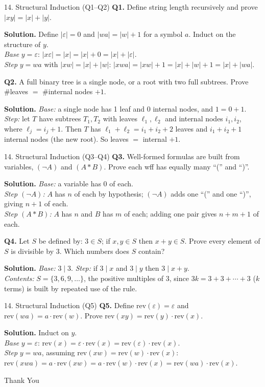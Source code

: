 \documentclass[aspectratio=169,10pt]{beamer}
\newcommand{\qa}[3]{%
  \textbf{Q#1.} #2\par\smallskip
  {\color{ans}\textbf{Solution.} #3}\par\vspace{6pt}}
\begin{document}
\begin{frame}{14. Structural Induction (Q1--Q2)}
\footnotesize
\qa{1}{Define string length recursively and prove $|xy|=|x|+|y|$.}
{Define $|\varepsilon|=0$ and $|wa|=|w|+1$ for a symbol $a$. Induct on the structure of $y$.\\
\emph{Base} $y=\varepsilon$: $|x\varepsilon|=|x|=|x|+0=|x|+|\varepsilon|$.\\
\emph{Step} $y=wa$ with $|xw|=|x|+|w|$: $|xwa|=|xw|+1=|x|+|w|+1=|x|+|wa|$.}
\qa{2}{A full binary tree is a single node, or a root with two full subtrees. Prove \#leaves $=$ \#internal nodes $+1$.}
{\emph{Base:} a single node has 1 leaf and 0 internal nodes, and $1=0+1$.\\
\emph{Step:} let $T$ have subtrees $T_1,T_2$ with leaves $\ell_1,\ell_2$ and internal nodes $i_1,i_2$, where $\ell_j=i_j+1$. Then $T$ has $\ell_1+\ell_2=i_1+i_2+2$ leaves and $i_1+i_2+1$ internal nodes (the new root). So leaves $=$ internal $+1$.}
\end{frame}

\begin{frame}{14. Structural Induction (Q3--Q4)}
\footnotesize
\qa{3}{Well-formed formulas are built from variables, $(\neg A)$ and $(A\ast B)$. Prove each wff has equally many ``('' and ``)''.}
{\emph{Base:} a variable has 0 of each.\\
\emph{Step $(\neg A)$:} $A$ has $n$ of each by hypothesis; $(\neg A)$ adds one ``('' and one ``)'', giving $n+1$ of each.\\
\emph{Step $(A\ast B)$:} $A$ has $n$ and $B$ has $m$ of each; adding one pair gives $n+m+1$ of each.}
\qa{4}{Let $S$ be defined by: $3\in S$; if $x,y\in S$ then $x+y\in S$. Prove every element of $S$ is divisible by 3. Which numbers does $S$ contain?}
{\emph{Base:} $3\mid3$. \emph{Step:} if $3\mid x$ and $3\mid y$ then $3\mid x+y$.\\
\emph{Contents:} $S=\{3,6,9,\dots\}$, the positive multiples of 3, since $3k=3+3+\cdots+3$ ($k$ terms) is built by repeated use of the rule.}
\end{frame}

\begin{frame}{14. Structural Induction (Q5)}
\footnotesize
\qa{5}{Define $\mathrm{rev}(\varepsilon)=\varepsilon$ and $\mathrm{rev}(wa)=a\cdot\mathrm{rev}(w)$. Prove $\mathrm{rev}(xy)=\mathrm{rev}(y)\cdot\mathrm{rev}(x)$.}
{Induct on $y$.\\
\emph{Base} $y=\varepsilon$: $\mathrm{rev}(x)=\varepsilon\cdot\mathrm{rev}(x)=\mathrm{rev}(\varepsilon)\cdot\mathrm{rev}(x)$.\\
\emph{Step} $y=wa$, assuming $\mathrm{rev}(xw)=\mathrm{rev}(w)\cdot\mathrm{rev}(x)$:\\
$\mathrm{rev}(xwa)=a\cdot\mathrm{rev}(xw)=a\cdot\mathrm{rev}(w)\cdot\mathrm{rev}(x)=\mathrm{rev}(wa)\cdot\mathrm{rev}(x)$.}
\end{frame}

\begin{frame}
  \centering
  \vspace{1cm}
  {\Huge Thank You}\\[1cm]
\end{frame}
\end{document}
